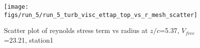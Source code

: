 \begin{figure}[H]
\centering
\texttt{[image: figs/run\_5/run\_5\_turb\_visc\_ettap\_top\_vs\_r\_mesh\_scatter]}
\caption{Scatter plot of reynolds stress term vs radius at $z/c$=5.37, $V_{free}$=23.21, station1}
\label{fig:run_5_turb_visc_ettap_top_vs_r_mesh_scatter}
\end{figure}


